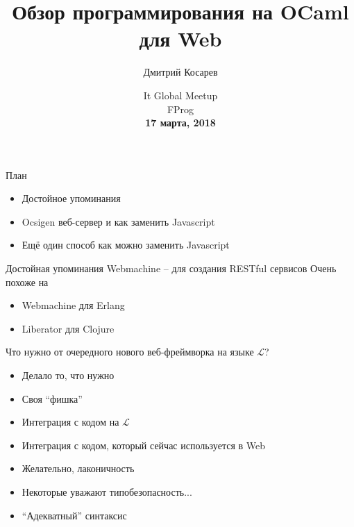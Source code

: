 \documentclass{beamer}
\title{Обзор программирования на OCaml для Web}
\author{Дмитрий Косарев}
\institute[]{
\small{
JetBrains Labs\\
}
}
\date{
  \vskip 2cm
  \small{
  It Global Meetup\\
  FProg\\
  \textbf{17 марта, 2018}
  }
}
\theoremstyle{definition}
\begin{document}
\begin{frame}
  \titlepage
\end{frame}

\begin{frame}[fragile]{План}
\begin{itemize}
 \item Достойное упоминания
 \item Ocsigen веб-сервер и как заменить Javascript
 \item Ещё один способ как можно заменить Javascript
\end{itemize}
\end{frame}

\begin{frame}[fragile]{Достойная упоминания}
Webmachine -- для создания RESTful сервисов
\href{http://github.com/inhabitedtype/ocaml-webmachine}{}
\vskip5mm
Очень похоже на

\begin{itemize}
 \item Webmachine для Erlang \href{http://github.com/webmachine/webmachine}{}
 \item Liberator для Clojure \href{http://clojure-liberator.github.io/liberator/}{}
\end{itemize}

\end{frame}


\begin{frame}[fragile]{Что нужно от очередного нового веб-фреймворка на языке $\mathscr{L}$?}
\begin{itemize}
 \item Делало то, что нужно
 \item Своя ``фишка''
 \item Интеграция с кодом на $\mathscr{L}$
 \item Интеграция с кодом, который сейчас используется в Web
 \item Желательно, лаконичность
 \item Некоторые уважают типобезопасность...
 \item ``Адекватный'' синтаксис
\end{itemize}

\end{frame}
\end{document}
